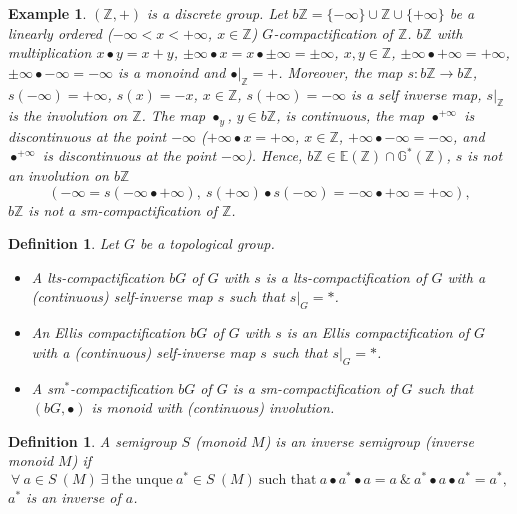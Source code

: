 \documentclass{amsart}
\newtheorem{ex}[thm]{Example}
\newtheorem{df}[thm]{Definition}
\begin{document}
\begin{ex}\label{example}
{\rm $(\mathbb Z, +)$ is a discrete group. Let $b\mathbb Z=\{-\infty\}\cup\mathbb Z\cup\{+\infty\}$ be a linearly ordered ($-\infty< x<+\infty$, $x\in\mathbb Z$) $G$-compactification of $\mathbb Z$. $b\mathbb Z$ with multiplication $x\bullet y=x+y$, $\pm\infty\bullet x=x\bullet\pm\infty=\pm\infty$, $x, y\in\mathbb Z$, $\pm\infty\bullet+\infty=+\infty$, $\pm\infty\bullet-\infty=-\infty$ is a monoind and $\bullet|_{\mathbb Z}=+$. Moreover, the map $s: b\mathbb Z\to b\mathbb Z$, $s(-\infty)=+\infty$, $s(x)=-x$, $x\in\mathbb Z$, $s(+\infty)=-\infty$ is a self inverse map, $s|_{\mathbb Z}$ is the involution on $\mathbb Z$. The map $\bullet_y$, $y\in b\mathbb Z$, is continuous,  the map $\bullet^{+\infty}$ is discontinuous at the point $-\infty$ ($+\infty\bullet x=+\infty$, $x\in\mathbb Z$, $+\infty\bullet-\infty=-\infty$, and $\bullet^{+\infty}$ is discontinuous at the point $-\infty$). Hence, $b\mathbb Z\in\mathbb E (\mathbb Z)\cap\mathbb G^*(\mathbb Z)$, $s$ is not an involution on $b\mathbb Z$
$$(-\infty=s(-\infty\bullet+\infty),\ s(+\infty)\bullet s(-\infty)=-\infty\bullet+\infty=+\infty),$$
$b\mathbb Z$ is not a sm-compactification of $\mathbb Z$.}
\end{ex}

\begin{df}
Let $G$ be a topological group. 
\begin{itemize}
\item  A lts-compactification $b G$ of $G$ with $s$ is a lts-compactification of $G$ with a {\rm(}continuous{\rm)}  self-inverse map $s$ such that $s|_G=*$.
\item An Ellis compactification $b G$ of $G$ with $s$ is an Ellis compactification of $G$ with a {\rm(}continuous{\rm)}  self-inverse map $s$ such that $s|_G=*$. 
\item A sm$^*$-compactification $b G$ of $G$ is a sm-compactification of $G$ such that $(bG, \bullet)$ is monoid with {\rm(}continuous{\rm)} involution. 
\end{itemize}
\end{df}

\begin{df}
A semigroup $S$ {\rm(}monoid $M${\rm)} is an inverse semigroup {\rm(}inverse monoid $M${\rm)} if 
$$\forall\ a\in S\ (M)\ \exists\ \mbox{the unque}\ a^*\in S\ (M)\ \mbox{such that}\ a\bullet a^*\bullet a=a\ \&\ a^*\bullet a\bullet a^*=a^*,$$
$a^*$ is an inverse of $a$.
\end{df}
\end{document}
